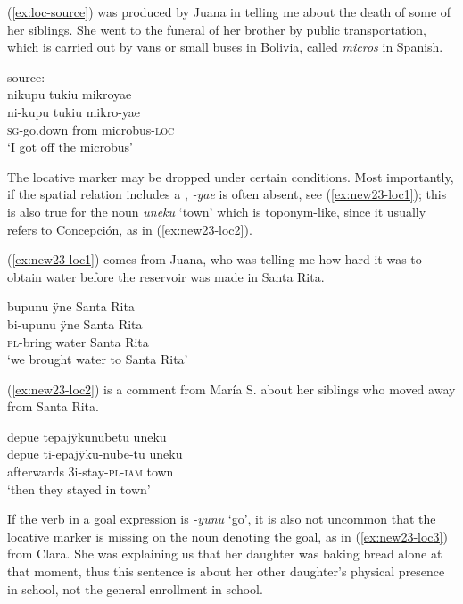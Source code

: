 (\ref{ex:loc-source}) was produced by Juana in telling me about the death of some of her siblings. She went to the funeral of her brother by public transportation, which is carried out by vans or small buses in Bolivia, called \textit{micros} in Spanish.

\ea\label{ex:loc-source}
\begingl
\glpreamble \textup{source:}\\nikupu tukiu mikroyae\\
\gla ni-kupu tukiu mikro-yae\\
\textsc{sg}-go.down from microbus-\textsc{loc}\\
\glft ‘I got off the microbus’
\endgl
\trailingcitation{[jxx-p120430l-2.465]}
\xe

The locative marker may be dropped under certain conditions. Most importantly, if the spatial relation includes a , \textit{-yae} is often absent, see (\ref{ex:new23-loc1}); this is also true for the noun \textit{uneku} ‘town’ which is toponym-like, since it usually refers to Concepción, as in (\ref{ex:new23-loc2}).

(\ref{ex:new23-loc1}) comes from Juana, who was telling me how hard it was to obtain water before the reservoir was made in Santa Rita.

\ea\label{ex:new23-loc1}
\begingl
\glpreamble bupunu ÿne Santa Rita\\
\gla bi-upunu ÿne {Santa Rita}\\
\textsc{pl}-bring water {Santa Rita}\\
\glft ‘we brought water to Santa Rita’
\endgl
\trailingcitation{[jxx-p120515l-2.054]}
\xe

(\ref{ex:new23-loc2}) is a comment from María S. about her siblings who moved away from Santa Rita.

\ea\label{ex:new23-loc2}
\begingl
\glpreamble depue tepajÿkunubetu uneku\\
\gla depue ti-epajÿku-nube-tu uneku\\
\glb afterwards 3i-stay-\textsc{pl}-\textsc{iam} town\\
\glft ‘then they stayed in town’
\endgl
\trailingcitation{[rxx-p181101l-2.264]}
\xe

If the verb in a goal expression is \textit{-yunu} ‘go’, it is also not uncommon that the locative marker is missing on the noun denoting the goal, as in (\ref{ex:new23-loc3}) from Clara. She was explaining us that her daughter was baking bread alone at that moment, thus this sentence is about her other daughter’s physical presence in school, not the general enrollment in school.

